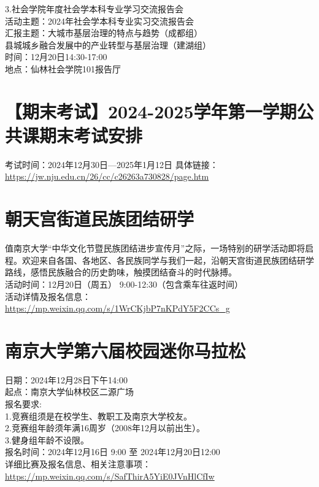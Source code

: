 \documentclass[letterpaper, 12pt]{article}
\begin{document}
\begin{multicols}{2}
3.社会学院年度社会学本科专业学习交流报告会\\
活动主题：2024年社会学本科专业实习交流报告会\\
汇报主题：大城市基层治理的特点与趋势（成都组）\\
县城城乡融合发展中的产业转型与基层治理（建湖组）\\
时间：12月20日14:30-17:00\\
地点：仙林社会学院101报告厅\\


\section{【期末考试】2024-2025学年第一学期公共课期末考试安排}
考试时间：2024年12月30日—2025年1月12日
具体链接：\url{https://jw.nju.edu.cn/26/cc/c26263a730828/page.htm}


\section{朝天宫街道民族团结研学}
值南京大学“中华文化节暨民族团结进步宣传月”之际，一场特别的研学活动即将启程。欢迎来自各国、各地区、各民族同学与我们一起，沿朝天宫街道民族团结研学路线，感悟民族融合的历史韵味，触摸团结奋斗的时代脉搏。\\
活动时间：12月20日（周五） 9:00-12:30（包含乘车往返时间）\\
活动详情及报名信息：\url{https://mp.weixin.qq.com/s/1WrCKjbP7nKPdY5F2CCs_g}\\
\section{南京大学第六届校园迷你马拉松}
日期：2024年12月28日下午14:00\\
起点：南京大学仙林校区二源广场\\
报名要求:\\
1.竞赛组须是在校学生、教职工及南京大学校友。\\
2.竞赛组年龄须年满16周岁（2008年12月以前出生）。\\
3.健身组年龄不设限。\\
报名时间：2024年12月16日 9:00 至 2024年12月20日12:00\\
详细比赛及报名信息、相关注意事项：\url{https://mp.weixin.qq.com/s/SafThirA5YiE0JVnHlCfIw}\\

\end{multicols}
\end{document}
